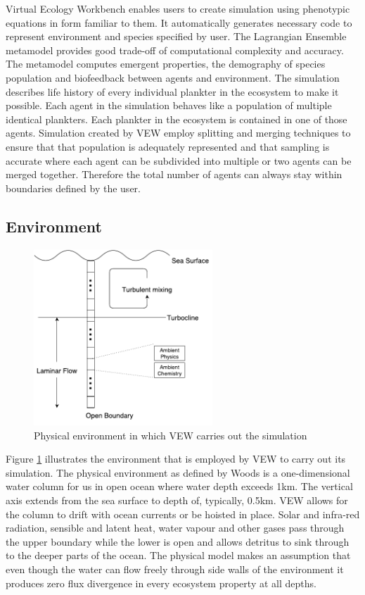 \documentclass[12pt, a4paper]{report}
\begin{document}
Virtual Ecology Workbench enables users to create simulation using
phenotypic equations in form familiar to them. It automatically
generates necessary code to represent environment and species
specified by user. The Lagrangian Ensemble metamodel
provides good trade-off of computational complexity and accuracy.
The metamodel computes emergent properties, the demography
of species population and biofeedback between agents and environment.
The simulation describes life history of every individual plankter
in the ecosystem to make it possible. Each agent in the simulation
behaves like a population of multiple identical plankters. Each
plankter in the ecosystem is contained in one of those agents.
Simulation created by VEW employ splitting and merging techniques
to ensure that that population is adequately represented and
that sampling is accurate where each agent can be subdivided into
multiple or two agents can be merged together. Therefore the
total number of agents can always stay within boundaries
defined by the user.

\subsection{Environment}\label{para:1d-phys}
\begin{figure}[H]
  \begin{center}
    \includegraphics[width=0.6\textwidth,natwidth=473,natheight=466]{images/env-diagram.pdf}
    \caption{Physical environment in which VEW carries out the simulation}
    \label{fig:env}
  \end{center}
\end{figure}

Figure \ref{fig:env} illustrates the environment that is employed by VEW
to carry out its simulation. The physical environment as defined by Woods \cite{Woods2005}
is a one-dimensional water column for us in open ocean where water depth exceeds 1km.
The vertical axis extends from the sea surface to depth of, typically, 0.5km.
VEW allows for the column to drift with ocean currents or be hoisted in place.
Solar and infra-red radiation, sensible and latent heat, water vapour
and other gases pass through the upper boundary while the lower is open
and allows detritus to sink through to the deeper parts of the ocean.
The physical model makes an assumption that even though the
water can flow freely through side walls of the environment it produces
zero flux divergence in every ecosystem property at all depths.
\end{document}
